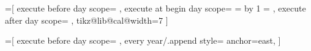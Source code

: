 \documentclass[10pt,landscape]{article}
\begin{document}
\pagestyle{empty}
    \makeatletter


    =[
        execute before day scope={%
        },
        execute at begin day scope={%
            \pgfmathsetlength\pgf@x{\tikz@lib@cal@xshift}%
            \ifnum{}
            \else
                \c@pgf@counta=\pgfcalendarcurrentweekday
                \advance\c@pgf@counta by 1
            \fi
            \pgf@x=\c@pgf@counta\pgf@x
        },
        execute after day scope={
        },
        tikz@lib@cal@width=7
    ]

    =[
        execute before day scope={
        },
        every year/.append style={
            anchor=east,
        }
    ]

\end{document}
